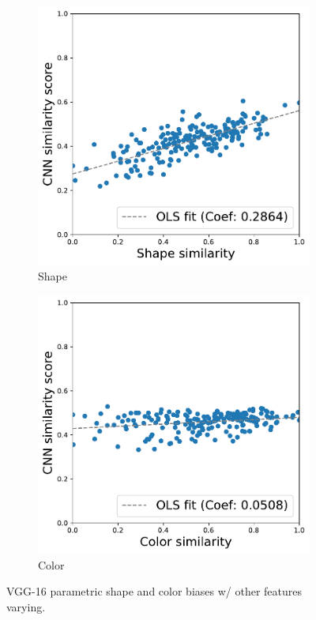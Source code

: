 \begin{figure}[h!]
    \begin{center}
        \begin{subfigure}[b]{0.235\textwidth}
            \includegraphics[width=\linewidth]{figures/vgg_shape_parametric.pdf}
            \caption{Shape}
        \end{subfigure}
        \begin{subfigure}[b]{0.235\textwidth}
            \includegraphics[width=\linewidth]{figures/vgg_color_parametric.pdf}
            \caption{Color}
        \end{subfigure}
    \end{center}
    \caption{VGG-16 parametric shape and color biases w/ other features varying.}
    \label{fig:parametric_others_varying}
\end{figure}
